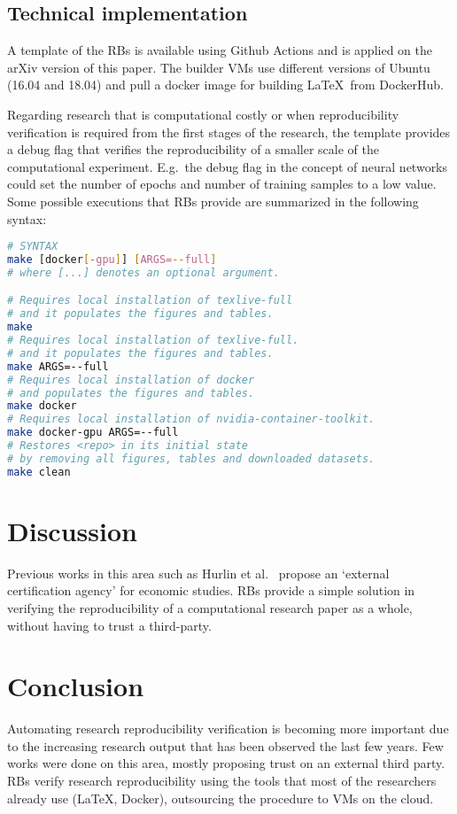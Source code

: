 \documentclass[journal]{IEEEtran}
\begin{document}
\subsection{Technical implementation}
A template of the RBs is available using Github Actions and is applied on the arXiv version of this paper.
The builder VMs use different versions of Ubuntu (16.04 and 18.04) and pull a docker image for building \LaTeX\ from DockerHub.

Regarding research that is computational costly or when reproducibility verification is required from the first stages of the research, the template provides a debug flag that verifies the reproducibility of a smaller scale of the computational experiment.
E.g.\ the debug flag in the concept of neural networks could set the number of epochs and number of training samples to a low value.
Some possible executions that RBs provide are summarized in the following syntax:
\begin{lstlisting}[language=Bash, style=lststyle, caption={Makefile call syntax from the shell.}, captionpos=b]
# SYNTAX
make [docker[-gpu]] [ARGS=--full]
# where [...] denotes an optional argument.

# Requires local installation of texlive-full
# and it populates the figures and tables.
make
# Requires local installation of texlive-full.
# and it populates the figures and tables.
make ARGS=--full
# Requires local installation of docker
# and populates the figures and tables.
make docker
# Requires local installation of nvidia-container-toolkit.
make docker-gpu ARGS=--full
# Restores <repo> in its initial state
# by removing all figures, tables and downloaded datasets.
make clean

\end{lstlisting}

\section{Discussion}
Previous works in this area such as Hurlin et al.~\cite{hurlin2019reproducibility} propose an `external certification agency' for economic studies.
RBs provide a simple solution in verifying the reproducibility of a computational research paper as a whole, without having to trust a third-party.

\section{Conclusion}
Automating research reproducibility verification is becoming more important due to the increasing research output that has been observed the last few years.
Few works were done on this area, mostly proposing trust on an external third party.
RBs verify research reproducibility using the tools that most of the researchers already use (\LaTeX, Docker), outsourcing the procedure to VMs on the cloud.
\end{document}
